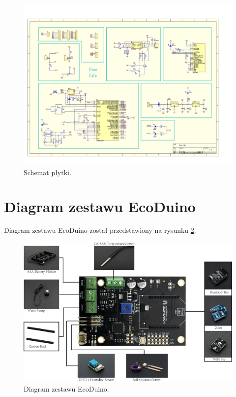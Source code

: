 \documentclass[a4paper,twoside,12pt]{book}
\begin{document}
\begin{figure}[H]
   \centering
   \includegraphics[width=\textwidth]{./assets/img/img003.jpg}
   \caption{Schemat płytki. \cite{bib:url002}}
   \label{fig:3}
\end{figure}

\newpage

\section{Diagram zestawu EcoDuino}

Diagram zestawu EcoDuino został przedstawiony na rysunku \ref{fig:4}.

\begin{figure}[H]
   \centering
   \includegraphics[width=\textwidth]{./assets/img/img004.jpg}
   \caption{Diagram zestawu EcoDuino. \cite{bib:url003}}
   \label{fig:4}
\end{figure}
\end{document}
